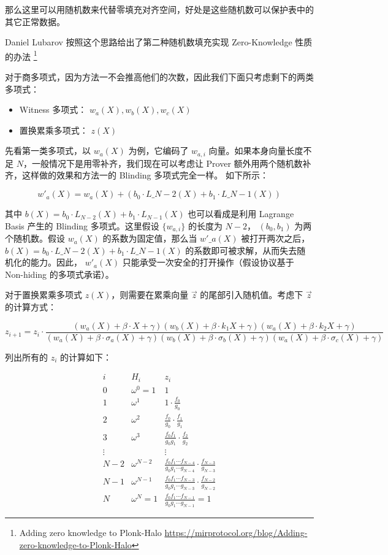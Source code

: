 那么这里可以用随机数来代替零填充对齐空间，好处是这些随机数可以保护表中的其它正常数据。

Daniel Lubarov 按照这个思路给出了第二种随机数填充实现 Zero-Knowledge
性质的办法 \footnote{Adding zero knowledge to Plonk-Halo \url{https://mirprotocol.org/blog/Adding-zero-knowledge-to-Plonk-Halo}}

对于商多项式，因为方法一不会推高他们的次数，因此我们下面只考虑剩下的两类多项式：

\begin{itemize}
\item
  Witness 多项式： \(w_a(X), w_b(X), w_c(X)\)
\item
  置换累乘多项式： \(z(X)\)
\end{itemize}

先看第一类多项式，以 \(w_a(X)\) 为例，它编码了 \(w_{a,i}\)
向量。如果本身向量长度不足
\(N\)，一般情况下是用零补齐，我们现在可以考虑让 Prover
额外用两个随机数补齐，这样做的效果和方法一的 Blinding 多项式完全一样。
如下所示：

\[
w'_a(X) = w_a(X) + (b_0\cdot L\_{N-2}(X) + b_1\cdot L\_{N-1}(X))
\]

其中 \(b(X)=b_0\cdot L_{N-2}(X) + b_1\cdot L_{N-1}(X)\) 也可以看成是利用
Lagrange Basis 产生的 Blinding 多项式。这里假设 \(\{w_{a,i}\}\) 的长度为
\(N-2\)， \((b_0, b_1)\) 为两个随机数。假设 \(w_a(X)\)
的系数为固定值，那么当 \(w'\_a(X)\) 被打开两次之后，
\(b(X)=b_0\cdot L\_{N-2}(X) + b_1\cdot L\_{N-1}(X)\)
的系数即可被求解，从而失去随机化的能力。因此， \(w'_a(X)\)
只能承受一次安全的打开操作（假设协议基于 Non-hiding 的多项式承诺）。

对于置换累乘多项式 \(z(X)\)，则需要在累乘向量 \(\vec{z}\)
的尾部引入随机值。考虑下 \(\vec{z}\) 的计算方式：

\[
z_{i+1} = z_i\cdot \frac{(w_a(X) + \beta\cdot X+\gamma)(w_b(X) + \beta\cdot k_1X+\gamma)(w_a(X) + \beta\cdot k_2X+\gamma)}{(w_a(X) + \beta\cdot\sigma_a(X)+\gamma)(w_b(X) + \beta\cdot \sigma_b(X)+\gamma)(w_a(X) + \beta\cdot\sigma_c(X)+\gamma)}
\]

列出所有的 \(z_i\) 的计算如下：

\[
\begin{array}{|c|c|c|}
i & H_i & z_i\\
\hline
0 & \omega^0=1 & 1\\
1 & \omega^1 & 1\cdot \frac{f_0}{g_0}\\
2 & \omega^2 & \frac{f_0}{g_0}\cdot \frac{f_1}{g_1}\\
3 & \omega^3 & \frac{f_0f_1}{g_0g_1}\cdot \frac{f_2}{g_2}\\
\vdots & & \vdots\\
N-2 & \omega^{N-2} & \frac{f_0f_1\cdots f_{N-4}}{g_0g_1\cdots g_{N-4}}\cdot \frac{f_{N-3}}{g_{N-3}} \\
N-1 & \omega^{N-1} & \frac{f_0f_1\cdots f_{N-3}}{g_0g_1\cdots g_{N-3}}\cdot \frac{f_{N-2}}{g_{N-2}} \\
N & \omega^{N}=1 & \frac{f_0f_1\cdots f_{N-1}}{g_0g_1\cdots g_{N-1}}  = 1
\end{array}
\]

